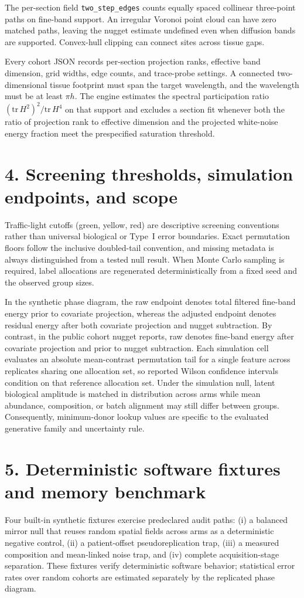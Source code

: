 \documentclass[11pt]{article}
\begin{document}
The per-section field \texttt{two\_step\_edges} counts equally spaced collinear three-point paths on fine-band support. An irregular Voronoi point cloud can have zero matched paths, leaving the nugget estimate undefined even when diffusion bands are supported. Convex-hull clipping can connect sites across tissue gaps.

Every cohort JSON records per-section projection ranks, effective band dimension, grid widths, edge counts, and trace-probe settings. A connected two-dimensional tissue footprint must span the target wavelength, and the wavelength must be at least $\pi h$. The engine estimates the spectral participation ratio $(\mathrm{tr}\,H^2)^2 / \mathrm{tr}\,H^4$ on that support and excludes a section fit whenever both the ratio of projection rank to effective dimension and the projected white-noise energy fraction meet the prespecified saturation threshold.

\section*{4. Screening thresholds, simulation endpoints, and scope}
Traffic-light cutoffs (green, yellow, red) are descriptive screening conventions rather than universal biological or Type~I error boundaries. Exact permutation floors follow the inclusive doubled-tail convention, and missing metadata is always distinguished from a tested null result. When Monte Carlo sampling is required, label allocations are regenerated deterministically from a fixed seed and the observed group sizes.

In the synthetic phase diagram, the raw endpoint denotes total filtered fine-band energy prior to covariate projection, whereas the adjusted endpoint denotes residual energy after both covariate projection and nugget subtraction. By contrast, in the public cohort nugget reports, raw denotes fine-band energy after covariate projection and prior to nugget subtraction. Each simulation cell evaluates an absolute mean-contrast permutation tail for a single feature across replicates sharing one allocation set, so reported Wilson confidence intervals condition on that reference allocation set. Under the simulation null, latent biological amplitude is matched in distribution across arms while mean abundance, composition, or batch alignment may still differ between groups. Consequently, minimum-donor lookup values are specific to the evaluated generative family and uncertainty rule.

\section*{5. Deterministic software fixtures and memory benchmark}
Four built-in synthetic fixtures exercise predeclared audit paths: (i) a balanced mirror null that reuses random spatial fields across arms as a deterministic negative control, (ii) a patient-offset pseudoreplication trap, (iii) a measured composition and mean-linked noise trap, and (iv) complete acquisition-stage separation. These fixtures verify deterministic software behavior; statistical error rates over random cohorts are estimated separately by the replicated phase diagram.
\end{document}
